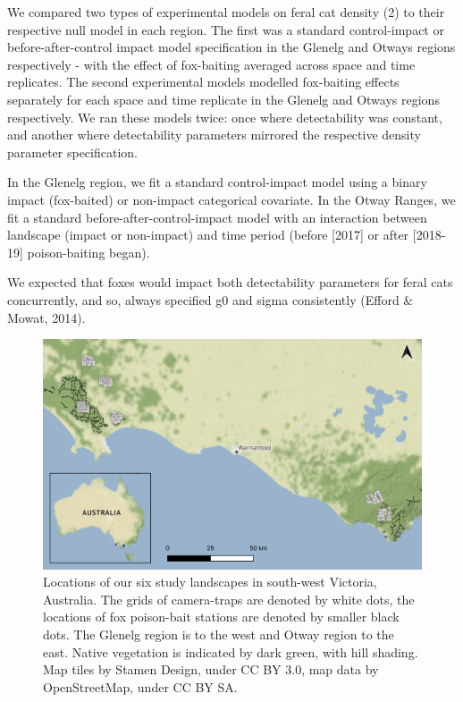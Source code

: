 \documentclass[]{elsarticle} %
\begin{document}
We compared two types of experimental models on feral cat density (2) to their respective null model in each region. The first was a standard control-impact or before-after-control impact model specification in the Glenelg and Otways regions respectively - with the effect of fox-baiting averaged across space and time replicates. The second experimental models modelled fox-baiting effects separately for each space and time replicate in the Glenelg and Otways regions respectively. We ran these models twice: once where detectability was constant, and another where detectability parameters mirrored the respective density parameter specification.

In the Glenelg region, we fit a standard control-impact model using a binary impact (fox-baited) or non-impact categorical covariate. In the Otway Ranges, we fit a standard before-after-control-impact model with an interaction between landscape (impact or non-impact) and time period (before {[}2017{]} or after {[}2018-19{]} poison-baiting began).

We expected that foxes would impact both detectability parameters for feral cats concurrently, and so, always specified g0 and sigma consistently (Efford \& Mowat, 2014).

\begin{figure}
\includegraphics[width=1\linewidth]{figs/fig1} \caption{Locations of our six study landscapes in south-west Victoria, Australia. The grids of camera-traps are denoted by white dots, the locations of fox poison-bait stations are denoted by smaller black dots. The Glenelg region is to the west and Otway region to the east. Native vegetation is indicated by dark green, with hill shading. Map tiles by Stamen Design, under CC BY 3.0, map data by OpenStreetMap, under CC BY SA.}\label{fig:map}
\end{figure}
\end{document}
